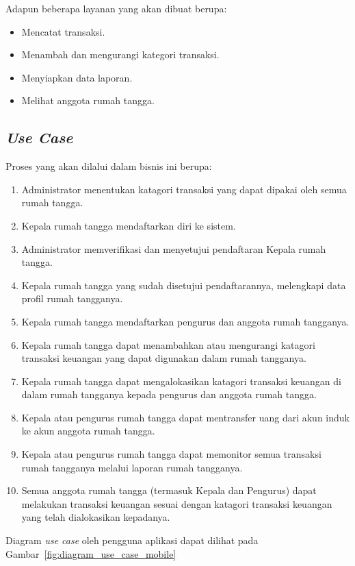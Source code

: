 Adapun beberapa layanan yang akan dibuat berupa:
\begin{itemize}
	\item Mencatat transaksi.
	\item Menambah dan mengurangi kategori transaksi.
	\item Menyiapkan data laporan.
	\item Melihat anggota rumah tangga.
\end{itemize}

\subsection{\textit{Use Case}}

\hspace{0,5cm}Proses yang akan dilalui dalam bisnis ini berupa:
\begin{enumerate}
	\item Administrator menentukan katagori transaksi yang dapat dipakai oleh semua rumah tangga.
	\item Kepala rumah tangga mendaftarkan diri ke sistem.
	\item Administrator memverifikasi dan menyetujui pendaftaran Kepala rumah tangga.
	\item Kepala rumah tangga yang sudah disetujui pendaftarannya, melengkapi data profil rumah tangganya.
	\item Kepala rumah tangga mendaftarkan pengurus dan anggota rumah tangganya.
	\item Kepala rumah tangga dapat menambahkan atau mengurangi katagori transaksi keuangan yang dapat digunakan dalam rumah tangganya.  
	\item Kepala rumah tangga dapat mengalokasikan katagori transaksi keuangan di dalam rumah tangganya kepada pengurus dan anggota rumah tangga.
	\item Kepala atau pengurus rumah tangga dapat mentransfer uang dari akun induk ke akun anggota rumah tangga.
	\item Kepala atau pengurus rumah tangga dapat memonitor semua transaksi rumah tangganya melalui laporan rumah tangganya.
	\item Semua anggota rumah tangga (termasuk Kepala dan Pengurus) dapat melakukan transaksi keuangan sesuai dengan katagori transaksi keuangan yang telah dialokasikan kepadanya.
\end{enumerate}

\hspace{0,5cm}Diagram \textit{use case} oleh pengguna aplikasi dapat dilihat pada Gambar~\ref{fig:diagram_use_case_mobile}

